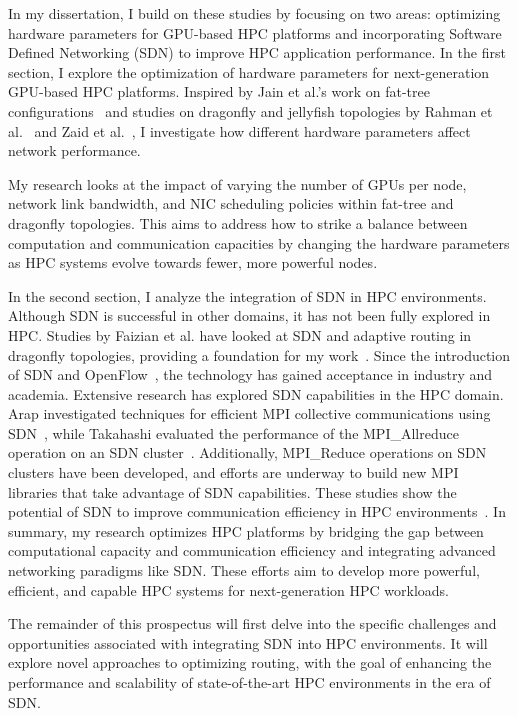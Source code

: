In my dissertation, I build on these studies by focusing on two areas: 
optimizing hardware parameters for GPU-based HPC platforms 
and incorporating Software Defined Networking (SDN) to improve HPC application performance.
In the first section, I explore the optimization of hardware parameters 
for next-generation GPU-based HPC platforms. Inspired by Jain et al.'s work on fat-tree configurations~\cite{jain2017predicting} 
and studies on dragonfly and jellyfish topologies by Rahman et al.~\cite{rahman2019topology} and Zaid et al.~\cite{alzaid2021multi}, 
I investigate how different hardware parameters affect network performance. 

My research looks at the impact of varying the number of GPUs per node, 
network link bandwidth, and NIC scheduling policies within 
fat-tree and dragonfly topologies. 
This aims to address how to strike a balance between computation 
and communication capacities by changing the hardware parameters
as HPC systems evolve towards fewer, more powerful nodes.

In the second section, I analyze the integration of SDN in HPC environments. 
Although SDN is successful in other domains, it has not been fully explored in HPC. 
Studies by Faizian et al. have looked at SDN and adaptive routing in 
dragonfly topologies, providing a foundation for my work~\cite{faizian2017comparative}.
Since the introduction of SDN and OpenFlow~\cite{openflow}, the technology has gained acceptance in 
industry and academia. Extensive research has explored SDN capabilities in the HPC domain. 
Arap investigated techniques for efficient MPI collective communications using SDN~\cite{arap2014software}, 
while Takahashi evaluated the performance of the MPI\_Allreduce operation on an SDN cluster~\cite{takahashi2014performance}. 
Additionally, MPI\_Reduce operations on SDN clusters have been developed, 
and efforts are underway to build new MPI libraries that 
take advantage of SDN capabilities. These studies show the potential of SDN to 
improve communication efficiency in HPC environments~\cite{munkhdorj2015design, takahashi2015concept}.
In summary, my research optimizes HPC platforms by bridging the gap between 
computational capacity and communication efficiency and integrating advanced networking paradigms like SDN. 
These efforts aim to develop more powerful, efficient, and capable HPC systems for next-generation HPC workloads. 

The remainder of this prospectus will first delve into the specific 
challenges and opportunities associated with integrating SDN 
into HPC environments. It will explore novel approaches to optimizing 
routing, with the goal of enhancing the performance and scalability 
of state-of-the-art HPC 
environments in the era of SDN.
